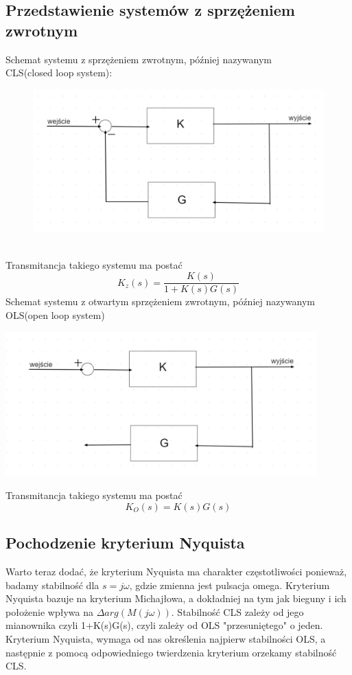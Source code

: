 \documentclass{article}
\begin{document}
\subsection{Przedstawienie systemów z sprzężeniem zwrotnym}
Schemat systemu z sprzężeniem zwrotnym, później nazywanym \\CLS(closed loop system):\\
\begin{figure}
    \includegraphics[width=12cm]{cls.png}
    \centering
\end{figure}
\\
Transmitancja takiego systemu ma postać
$$K_z(s)=\frac{K(s)}{1+K(s)G(s)}$$
Schemat systemu z otwartym sprzężeniem zwrotnym, później nazywanym OLS(open loop system)
\begin{center}
\includegraphics[width=12cm]{ols.png}    
\end{center}
Transmitancja takiego systemu ma postać
$$K_O(s)=K(s)G(s)$$
\newpage
\subsection{Pochodzenie kryterium Nyquista}
Warto teraz dodać, że kryterium Nyquista ma charakter częstotliwości ponieważ, badamy stabilność dla $s=j\omega$, gdzie zmienna jest pulsacja omega. Kryterium Nyquista bazuje na kryterium Michajłowa, a dokładniej na tym jak bieguny i ich położenie wpływa na $\Delta arg(M(j\omega))$. Stabilność CLS zależy od jego mianownika czyli 1+K(s)G(s), czyli zależy od OLS "przesuniętego" o jeden. Kryterium Nyquista, wymaga od nas określenia najpierw stabilności OLS, a następnie z pomocą odpowiedniego twierdzenia kryterium orzekamy stabilność CLS.\\
\end{document}
